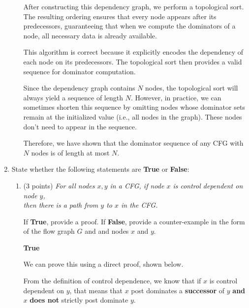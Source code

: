 \documentclass[12pt]{article}
\begin{document}
\begin{enumerate}
\begin{enumerate}
\begin{mdframed}
    After constructing this dependency graph, we perform a topological sort. The resulting ordering ensures that every node appears after its predecessors, guaranteeing that when we compute the dominators of a node, all necessary data is already available.

    This algorithm is correct because it explicitly encodes the dependency of each node on its predecessors. The topological sort then provides a valid sequence for dominator computation.

    Since the dependency graph contains \( N \) nodes, the topological sort will always yield a sequence of length \( N \). However, in practice, we can sometimes shorten this sequence by omitting nodes whose dominator sets remain at the initialized value (i.e., all nodes in the graph). These nodes don't need to appear in the sequence.

    Therefore, we have shown that the dominator sequence of any CFG with \( N \) nodes is of length at most \( N \).

      
    \end{mdframed}
  \end{enumerate}

  \item State whether the following statements are \textbf{True} or
  \textbf{False}:
  \begin{enumerate}
    \item (3 points) \emph{For all nodes $x, y$ in a CFG, if node $x$ is
    control dependent on node $y$, \\
    then there is a path from $y$ to $x$ in the CFG.}

    If \textbf{True}, provide a proof.
    If \textbf{False}, provide a counter-example in the form of the flow
    graph $G$ and and nodes $x$ and $y$.
    \begin{mdframed}
      
      \textbf{True}

      \vspace{0.5em}

      We can prove this using a direct proof, shown below.

      \vspace{0.5em}

      From the definition of control dependence, we know that if $x$ is control dependent on $y$, that means that $x$ post dominates a \textbf{successor} of $y$ \textbf{and} $x$ \textbf{does not} strictly post dominate $y$.


\end{mdframed}
\end{enumerate}
\end{enumerate}
\end{document}
